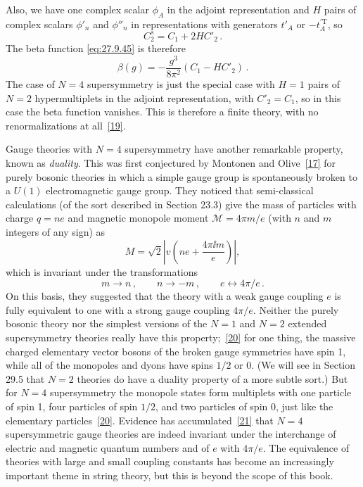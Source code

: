 Also, we have one complex scalar \(\phi_A\) in the adjoint representation
and \(H\) pairs of complex scalars \(\phi'_n\) and \(\phi''_n\) in
representations with generators \(t'_A\) or \(-t_A^{\prime\mathrm T}\), so
\begin{equation}
  C_2^s=C_1+2HC'_2\,.
  \tag{27.9.49}\label{eq:27.9.49}
\end{equation}
The beta function \eqref{eq:27.9.45} is therefore
\begin{equation}
  \beta(g)=-\frac{g^3}{8\pi^2}(C_1-HC'_2)\,.
  \tag{27.9.50}\label{eq:27.9.50}
\end{equation}
The case of \(N=4\) supersymmetry is just the special case with \(H=1\)
pairs of \(N=2\) hypermultiplets in the adjoint representation, with
\(C'_2=C_1\), so in this case the beta function vanishes. This is therefore
a finite theory, with no renormalizations at
all~\hyperref[ch27-ref-19]{[19]}.

Gauge theories with \(N=4\) supersymmetry have another remarkable property,
known as \emph{duality}. This was first conjectured by Montonen and
Olive~\hyperref[ch27-ref-17]{[17]} for purely bosonic theories in which a
simple gauge group is spontaneously broken to a \(U(1)\) electromagnetic
gauge group. They noticed that semi-classical calculations (of the sort
described in Section 23.3) give the mass of particles with charge \(q=ne\)
and magnetic monopole moment \(\mathcal{M}=4\pi m/e\) (with \(n\) and \(m\)
integers of any sign) as
\begin{equation}
  M=\sqrt{2}\left|v\left(ne+\frac{4\pi \ii m}{e}\right)\right|,
  \tag{27.9.51}\label{eq:27.9.51}
\end{equation}
which is invariant under the transformations
\begin{equation}
  m\longrightarrow n\,,
  \qquad
  n\longrightarrow-m\,,
  \qquad
  e\longleftrightarrow4\pi/e\,.
  \tag{27.9.52}\label{eq:27.9.52}
\end{equation}
On this basis, they suggested that the theory with a weak gauge coupling
\(e\) is fully equivalent to one with a strong gauge coupling \(4\pi/e\).
Neither the purely bosonic theory nor the simplest versions of the \(N=1\)
and \(N=2\) extended supersymmetry theories really have this
property;~\hyperref[ch27-ref-20]{[20]} for one thing, the massive charged
elementary vector bosons of the broken gauge symmetries have spin 1, while
all of the monopoles and dyons have spins \(1/2\) or 0. (We will see in
Section 29.5 that \(N=2\) theories do have a duality property of a more
subtle sort.) But for \(N=4\) supersymmetry the monopole states form
multiplets with one particle of spin 1, four particles of spin \(1/2\), and
two particles of spin 0, just like the elementary
particles~\hyperref[ch27-ref-20]{[20]}. Evidence has
accumulated~\hyperref[ch27-ref-21]{[21]} that \(N=4\) supersymmetric gauge
theories are indeed invariant under the interchange of electric and magnetic
quantum numbers and of \(e\) with \(4\pi/e\). The equivalence of theories
with large and small coupling constants has become an increasingly important
theme in string theory, but this is beyond the scope of this book.

